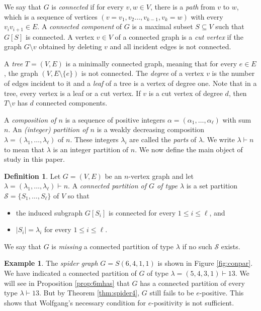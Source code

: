 \documentclass[12pt]{amsart}  %
\theoremstyle{definition}
\newtheorem{definition}[theorem]{Definition}
\newtheorem{example}[theorem]{Example}
\theoremstyle{remark}
\numberwithin{equation}{section}
\begin{document}
We say that $G$ is \emph{connected} if for every $v,w\in V$, there is a \emph{path} from $v$ to $w$, which is a sequence of vertices $(v=v_1,v_2\ldots,v_{k-1},v_k=w)$ with every $v_iv_{i+1}\in E$. A \emph{connected component} of $G$ is a maximal subset $S\subseteq V$ such that $G[S]$ is connected. A vertex $v\in V$ of a connected graph is a \emph{cut vertex} if the graph $G\setminus v$ obtained by deleting $v$ and all incident edges is not connected.

A \emph{tree} $T=(V,E)$ is a minimally connected graph, meaning that for every $e\in E$, the graph $(V,E\setminus \{e\})$ is not connected. The \emph{degree} of a vertex $v$ is the number of edges incident to it and a \emph{leaf} of a tree is a vertex of degree one. Note that in a tree, every vertex is a leaf or a cut vertex. If $v$ is a cut vertex of degree $d$, then $T\setminus v$ has $d$ connected components.

A \emph{composition of $n$} is a sequence of positive integers $\alpha=(\alpha_1,\ldots,\alpha_\ell)$ with sum $n$. An \emph{(integer) partition of $n$} is a weakly decreasing composition $\lambda=(\lambda_1,\ldots,\lambda_\ell)$ of $n$. These integers $\lambda_i$ are called the \emph{parts} of $\lambda$. We write $\lambda\vdash n$ to mean that $\lambda$ is an integer partition of $n$. We now define the main object of study in this paper.
\begin{definition}
Let $G=(V,E)$ be an $n$-vertex graph and let $\lambda=(\lambda_1,\ldots,\lambda_\ell)\vdash n$. A \emph{connected partition of $G$ of type $\lambda$} is a set partition $\mathcal S=\{S_1,\ldots,S_\ell\}$ of $V$ so that
\begin{itemize}
\item the induced subgraph $G[S_i]$ is connected for every $1\leq i\leq\ell$, and
\item $|S_i|=\lambda_i$ for every $1\leq i\leq\ell$.
\end{itemize} 
We say that $G$ is \emph{missing} a connected partition of type $\lambda$ if no such $\mathcal S$ exists.
\end{definition}

\begin{example}
The \emph{spider graph} $G=S(6,4,1,1)$ is shown in Figure \ref{fig:conpar}. We have indicated a connected partition of $G$ of type $\lambda=(5,4,3,1)\vdash 13$. We will see in Proposition \ref{prop:6mhas} that $G$ has a connected partition of every type $\lambda\vdash 13$. But by Theorem \ref{thm:spider4}, $G$ still fails to be $e$-positive. This shows that Wolfgang's necessary condition for $e$-positivity is not sufficient.
\end{example}
\end{document}
